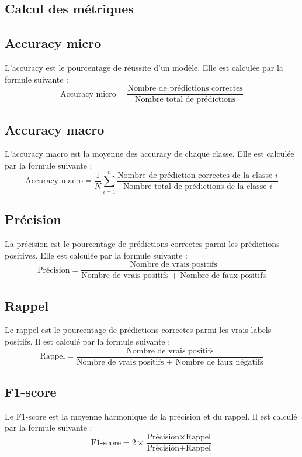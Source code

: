 \documentclass[a4paper]{article}
\begin{document}
\begin{appendices}
\section{Calcul des métriques}
\label{sec: metrics}

\subsection{Accuracy micro}
L'accuracy est le pourcentage de réussite d'un modèle. Elle est calculée par la formule suivante :
\begin{equation}
    \text{Accuracy micro} = \frac{\text{Nombre de prédictions correctes}}{\text{Nombre total de prédictions}}
\end{equation}

\subsection{Accuracy macro}
L'accuracy macro est la moyenne des accuracy de chaque classe. Elle est calculée par la formule suivante :
\begin{equation}
    \text{Accuracy macro} = \frac{1}{N} \sum_{i=1}^{n} \frac{\text{Nombre de prédiction correctes de la classe } i}{\text{Nombre total de prédictions de la classe } i}{}
\end{equation}

\subsection{Précision}
La précision est le pourcentage de prédictions correctes parmi les prédictions positives. Elle est calculée par la formule suivante :
\begin{equation}
    \text{Précision} = \frac{\text{Nombre de vrais positifs}}{\text{Nombre de vrais positifs + Nombre de faux positifs}}
\end{equation}

\subsection{Rappel}
Le rappel est le pourcentage de prédictions correctes parmi les vrais labels positifs. Il est calculé par la formule suivante :
\begin{equation}
    \text{Rappel} = \frac{\text{Nombre de vrais positifs}}{\text{Nombre de vrais positifs + Nombre de faux négatifs}} 
\end{equation}

\subsection{F1-score}
Le F1-score est la moyenne harmonique de la précision et du rappel. Il est calculé par la formule suivante :
\begin{equation}
    \text{F1-score} = 2 \times \frac{\text{Précision} \times \text{Rappel}}{\text{Précision} + \text{Rappel}}
\end{equation}


\end{appendices}
\end{document}
